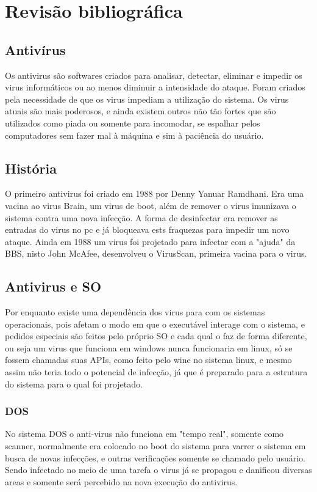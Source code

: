 
\chapter{Revisão bibliográfica}

\section{Antivírus}
Os antivirus são softwares criados para analisar, detectar, eliminar e impedir os virus informáticos ou ao menos diminuir a intensidade do ataque. Foram criados pela necessidade de que os virus impediam a utilização do sistema. Os virus atuais são mais poderosos, e ainda existem outros não tão fortes que são utilizados como piada ou somente para incomodar, se espalhar pelos computadores sem fazer mal à máquina e sim à paciência do usuário.

\section{História}
O primeiro antivirus foi criado em 1988 por Denny Yanuar Ramdhani. Era uma vacina ao virus Brain, um virus de boot, além de remover o virus imunizava o sistema contra uma nova infecção. A forma de desinfectar era remover as entradas do virus no pc e já bloqueava ests fraquezas para impedir um novo ataque. Ainda em 1988 um virus foi projetado para infectar com a "ajuda" da BBS, nisto John McAfee, desenvolveu o VirusScan, primeira vacina para o virus.
\section{Antivirus e SO}
Por enquanto existe uma dependência dos virus para com os sistemas operacionais, pois afetam o modo em que o executável interage com o sistema, e pedidos especiais são feitos pelo próprio SO e cada qual o faz de forma diferente, ou seja um virus que funciona em windows nunca funcionaria em linux, só se fossem chamadas suas APIs, como feito pelo wine no sistema linux, e mesmo assim não teria todo o potencial de infecção, já que é preparado para a estrutura do sistema para o qual foi projetado.

\subsection{DOS}
No sistema DOS o anti-virus não funciona em "tempo real", somente como scanner, normalmente era colocado no boot do sistema para varrer o sistema em busca de novas infecções, e outras verificações somente se chamado pelo usuário. Sendo infectado no meio de uma tarefa o virus já se propagou e danificou diversas areas e somente será percebido na nova execução do antivirus.

